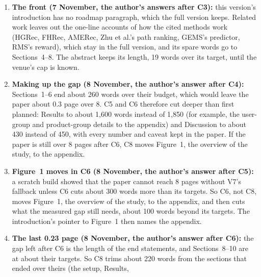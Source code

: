 \documentclass[11pt,a4paper]{article}
\DeclareRobustCommand{\code}[1]{\texttt{\detokenize{#1}}}
\begin{document}
\begin{enumerate}[label=V\arabic*]
        as an average random draw, where Results says about as well. C8 changed two shared
        things that were not errors: the publisher, address and page fields of the shared
        bibliographies (V3), and the sides of the \code{PCP} and \code{PPP} labels, set in
        \code{make_numbers.py}, which also move in the full version's figure. The review after C8
        changed a third: ten data shares, such as the 75\% of the test edges on books and music,
        printed as whole percentages against the rounding rule and now have one decimal.
  \item \textbf{The front (7 November, the author's answers after C3):} this version's
        introduction has no roadmap paragraph, which the full version keeps. Related work leaves
        out the one-line accounts of how the cited methods work (HGRec, FHRec, AMERec, Zhu et
        al.'s path ranking, GEMS's predictor, RMS's reward), which stay in the full version, and
        its spare words go to Sections~4--8. The abstract keeps its
        length, 19 words over its target, until the venue's cap is known.
  \item \textbf{Making up the gap (8 November, the author's answer after C4):} Sections~1--6 end
        about 260 words over their budget, which would leave the paper about 0.3 page over 8.
        C5 and C6 therefore cut deeper than first planned: Results to about 1,600 words instead
        of 1,850 (for example, the user-group and product-group details to the appendix) and
        Discussion to about 430 instead of 450, with every number and caveat kept in the paper.
        If the paper is still over 8 pages after C6, C8 moves Figure~1, the overview of the
        study, to the appendix.
  \item \textbf{Figure~1 moves in C6 (8 November, the author's answer after C5):} a scratch
        build showed that the paper cannot reach 8 pages without V7's fallback unless C6 cuts
        about 300 words more than its targets. So C6, not C8, moves Figure~1, the overview of
        the study, to the appendix, and then cuts what the measured gap still needs, about 100
        words beyond its targets. The introduction's pointer to Figure~1 then names the
        appendix.
  \item \textbf{The last 0.23 page (8 November, the author's answer after C6):} the gap left after
        C6 is the length of the end statements, and Sections~8--10 are at about their targets. So
        C8 trims about 220 words from the sections that ended over theirs (the setup, Results,

\end{enumerate}
\end{document}
